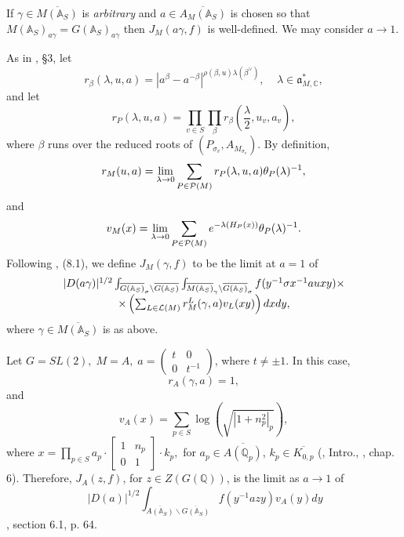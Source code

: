 If $\gamma \in \overline{M({\mathbb {A}}_S)}$
is {\em arbitrary} and $a\in \overline{A_M({\mathbb {A}}_S)}$ is
chosen so that
$M({\mathbb {A}}_S)_{a\gamma }=G({\mathbb {A}}_S)_{a\gamma }$
then $J_M(a\gamma ,f)$ is well-defined. We may consider
$a\rightarrow 1$.

As in \cite{A7}, \S 3, let 
\[
r_\beta (\lambda ,u,a)
=|a^\beta -a^{-\beta }|^{\rho (\beta ,u)\lambda (\beta^{\vee })},
\;\;\;\;\lambda \in {\mathfrak {a}}_{M,{\mathbb {C}}}^{*}, 
\]
and let 
\[
r_P(\lambda ,u,a)
=\prod_{v\in S}\prod_\beta
r_\beta (\frac \lambda 2,u_v,a_v), 
\]
where $\beta $ runs over the reduced roots of
$(P_{\sigma _v},A_{M_{\sigma_v}})$. By definition, 
\[
r_M(u ,a)=\lim_{\lambda \rightarrow 0}
\sum_{P\in {\cal P}(M)}r_P(\lambda ,u,a)\theta _P(\lambda )^{-1}, 
\]
and 
\[
v_M(x)=\lim_{\lambda \rightarrow 0}
\sum_{P\in {\cal P}(M)}e^{-\lambda (H_P(x))}
\theta _P(\lambda )^{-1}. 
\]
Following \cite{A7}, (8.1),
we define $J_M(\gamma ,f)$ to be the limit at $a=1$
of 
\begin{equation}
\begin{array}{c}
|D(a\gamma )|^{1/2}
\int_{\overline{G({\mathbb {A}}_S)}_\sigma \backslash
\overline{G({\mathbb {A}}_S)}}
\int_{\overline{M({\mathbb {A}}_S)}_\gamma
\backslash \overline{G({\mathbb {A}}_S)}_\sigma }
f(y^{-1}\sigma x^{-1}a u xy)\times \\
\times
\left( \sum_{L\in {\cal{L}}(M)}
r_M^L(\gamma ,a)v_L(xy)\right) dxdy,
\end{array}
\end{equation}
where $\gamma\in \overline{M({\mathbb A}_S)}$ is as above.
\begin{example}
Let $G=SL(2),\;M=A,\;a=\left( 
\begin{array}{cc}
t & 0 \\ 
0 & t^{-1}
\end{array}
\right) $, where $t\neq \pm 1$. In this case, 
\[
r_A(\gamma ,a)=1,
\]
and 
\[
v_A(x)=\sum_{p\in S}\log (\sqrt{|1+n_p^2|_p}),
\]
where $x=\prod_{p\in S}a_p\cdot \left[ 
\begin{array}{cc}
1 & n_p \\ 
0 & 1
\end{array}
\right] \cdot k_p,$ for
$a_p\in \overline{A({\mathbb {Q}}_p)}$, $k_p\in \overline{K_{0,p}}$
(\cite{A6}, Intro., \cite{Sho}, chap. 6). Therefore,
$J_A(z,f)$, for $z\in Z(G({\mathbb Q}))$,
is the limit as $a\rightarrow 1$ of 
\begin{equation}
\ |D(a)|^{1/2}
\int_{\overline{A({\mathbb {A}}_S)}\backslash \overline{G({\mathbb {A}}_S)}}
f(y^{-1} az y)v_A(y)dy 
\end{equation}
\cite{Sho}, section 6.1, p. 64.
\end{example}

